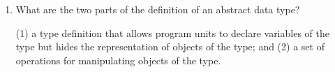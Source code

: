 \begin{enumerate}
\begin{answer}
    \end{answer}


  \item What are the two parts of the definition 
    of an abstract data type?

  \begin{answer}

   (1) a type definition that allows program units to declare variables of the type but hides the representation of objects of the type; and (2) a set of operations for manipulating objects of the type.

    \end{answer}


  \end{enumerate}


